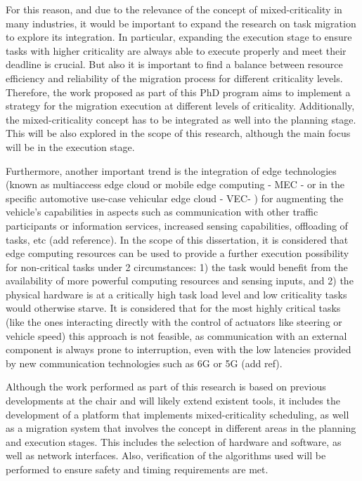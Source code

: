 For this reason, and due to the relevance of the concept of mixed-criticality in many industries, it would be important to expand the research on task migration to explore its integration. In particular, expanding the execution stage to ensure tasks with higher criticality are always able to execute properly and meet their deadline is crucial. But also it is important to find a balance between resource efficiency and reliability of the migration process for different criticality levels. Therefore, the work proposed as part of this PhD program aims to implement a strategy for the migration execution at different levels of criticality. Additionally, the mixed-criticality concept has to be integrated as well into the planning stage. This will be also explored in the scope of this research, although the main focus will be in the execution stage.

Furthermore, another important trend is the integration of edge technologies (known as multiaccess edge cloud or mobile edge computing - MEC - or in the specific automotive use-case vehicular edge cloud - VEC- ) for augmenting the vehicle's capabilities in aspects such as communication with other traffic participants or information services, increased sensing capabilities, offloading of tasks, etc (add reference). In the scope of this dissertation, it is considered that edge computing resources can be used to provide a further execution possibility for non-critical tasks under 2 circumstances: 1) the task would benefit from the availability of more powerful computing resources and sensing inputs, and 2) the physical hardware is at a critically high task load level and low criticality tasks would otherwise starve. It is considered that for the most highly critical tasks (like the ones interacting directly with the control of actuators like steering or vehicle speed) this approach is not feasible, as communication with an external component is always prone to interruption, even with the low latencies provided by new communication technologies such as 6G or 5G (add ref).

Although the work performed as part of this research is based on previous developments at the chair and will likely extend existent tools, it includes the development of a platform that implements mixed-criticality scheduling, as well as a migration system that involves the concept in different areas in the planning and execution stages. This includes the selection of hardware and software, as well as network interfaces. Also, verification of the algorithms used will be performed to ensure safety and timing requirements are met.

